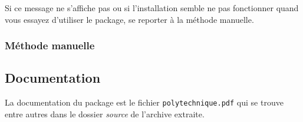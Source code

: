 \documentclass[a4paper,12pt,twoside]{article}
\begin{document}
Si ce message ne s'affiche pas ou si l'installation semble ne pas fonctionner quand vous essayez d'utiliser le package, se reporter à la méthode manuelle.
\subsubsection{Méthode manuelle}


\subsection{Documentation}

La documentation du package est le fichier \texttt{polytechnique.pdf} qui se trouve entre autres dans le dossier \emph{source} de l'archive extraite.
\end{document}
